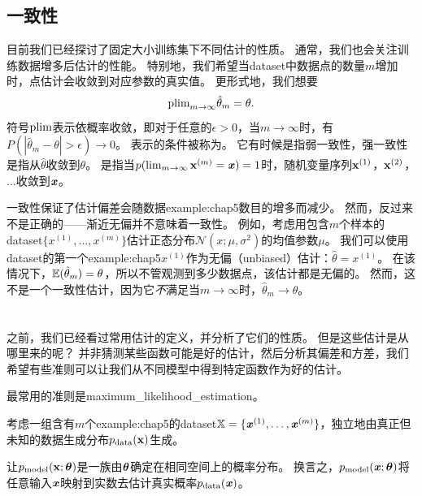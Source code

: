 \subsection{一致性}
\label{sec:consistency}
目前我们已经探讨了固定大小训练集下不同估计的性质。
通常，我们也会关注训练数据增多后估计的性能。
特别地，我们希望当\gls{dataset}中数据点的数量$m$增加时，点估计会收敛到对应参数的真实值。
更形式地，我们想要
\begin{equation}
\label{eq:5.55}
    \text{plim}_{m\to\infty} \hat{\theta}_m = \theta.
\end{equation}
符号$\text{plim}$表示依概率收敛，即对于任意的$\epsilon > 0$，当$m\to\infty$时，有$P(|\hat{\theta}_m - \theta| > \epsilon) \to 0$。
表示的条件被称为。
它有时候是指弱一致性，强一致性是指从$\hat{\theta}$收敛到$\theta$。
是指当$p(\lim_{m\to\infty} \mathbf{x}^{(m)} = \boldsymbol{\mathit{x}}) = 1 $时，随机变量序列$\mathbf{x}^{(1)}$，$\mathbf{x}^{(2)}$，$\dots$收敛到$\boldsymbol{\mathit{x}}$。

一致性保证了估计偏差会随数据\gls{example:chap5}数目的增多而减少。
然而，反过来不是正确的——渐近无偏并不意味着一致性。
例如，考虑用包含$m$个样本的\gls{dataset}$\{x^{(1)},\dots,x^{(m)}\}$估计正态分布$\mathcal{N}(x;\mu,\sigma^2)$的均值参数$\mu$。
我们可以使用\gls{dataset}的第一个\gls{example:chap5}$x^{(1)}$作为无偏（unbiased）估计：$\hat{\theta} = x^{(1)}$。
在该情况下，$\mathbb{E}(\hat{\theta}_m) = \theta$，所以不管观测到多少数据点，该估计都是无偏的。
然而，这不是一个一致性估计，因为它\emph{不}满足当$m\to\infty$时，$\hat{\theta}_m \to \theta$。


\section{}
\label{sec:maximum_likelihood_estimation}
之前，我们已经看过常用估计的定义，并分析了它们的性质。
但是这些估计是从哪里来的呢？
并非猜测某些函数可能是好的估计，然后分析其偏差和方差，我们希望有些准则可以让我们从不同模型中得到特定函数作为好的估计。

最常用的准则是\gls{maximum_likelihood_estimation}。

考虑一组含有$m$个\gls{example:chap5}的\gls{dataset}$\mathbb{X}=\{ \boldsymbol{\mathit{x}}^{(1)},\dots, \boldsymbol{\mathit{x}}^{(m)} \}$，独立地由真正但未知的数据生成分布$p_{\text{data}}(\mathbf{x})$生成。

让$p_{\text{model}}( \mathbf{x}; \boldsymbol{\theta} )$是一族由$\boldsymbol{\theta}$确定在相同空间上的概率分布。
换言之，$p_{\text{model}}(\boldsymbol{\mathit{x}};\boldsymbol{\theta})$将任意输入$\boldsymbol{\mathit{x}}$映射到实数去估计真实概率$p_{\text{data}}(\boldsymbol{\mathit{x}})$。

